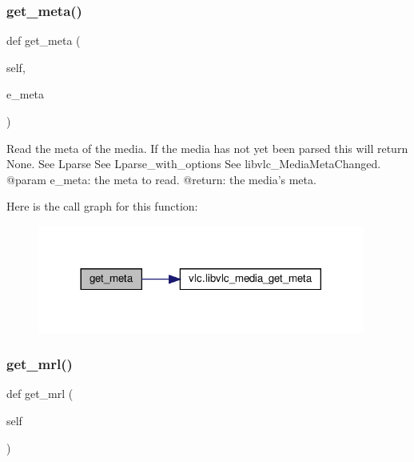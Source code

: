 \subsubsection{\texorpdfstring{get\+\_\+meta()}{get\_meta()}}
{\footnotesize\ttfamily def get\+\_\+meta (\begin{DoxyParamCaption}\item[{}]{self,  }\item[{}]{e\+\_\+meta }\end{DoxyParamCaption})}

\begin{DoxyVerb}Read the meta of the media.
If the media has not yet been parsed this will return None.
See L{parse}
See L{parse_with_options}
See libvlc_MediaMetaChanged.
@param e_meta: the meta to read.
@return: the media's meta.
\end{DoxyVerb}
 Here is the call graph for this function\+:
\nopagebreak
\begin{figure}[H]
\begin{center}
\leavevmode
\includegraphics[width=305pt]{classvlc_1_1_media_ae1d2cbf8cdcc58f21b6233ceb681bac6_cgraph}
\end{center}
\end{figure}
\mbox{\label{classvlc_1_1_media_ad16baf151ea7a01a45c3c343700f9bb6}} 
\subsubsection{\texorpdfstring{get\+\_\+mrl()}{get\_mrl()}}
{\footnotesize\ttfamily def get\+\_\+mrl (\begin{DoxyParamCaption}\item[{}]{self }\end{DoxyParamCaption})}

